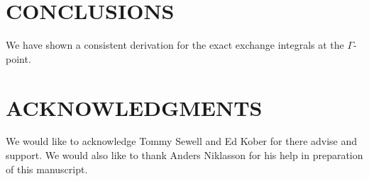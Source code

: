 \documentclass[prb,aps,nobibnotes,twocolumn,doublespace,twocolumngrid,superbib]{revtex4}
\begin{document}
\section{CONCLUSIONS}
We have shown a consistent derivation for the exact exchange integrals at the $\Gamma$-point. 

\section*{ACKNOWLEDGMENTS}

We would like to acknowledge Tommy Sewell and Ed Kober for there advise
and support. We would also like to thank Anders Niklasson for his help
in preparation of this manuscript. 

 



\eject

\begin{table}
\caption{Comparison \textbf{MondoSCF} and \textbf{Crystal98} for a 
Magnesium Oxide test system within the Hartree-Fock approxiamtion using
the STO-3G basis set. The \textbf{MondoSCF} calculations where done to
the accuracy of the quoted digits. All calculations where done at the Gamma point
for comparison except the last \textbf{Crystal98} calculation, which was done at 
${\bf k}_{max}=\{6,6,6\}$.}
\label{table:ComToCrystal98}
\end{table}
\end{document}
